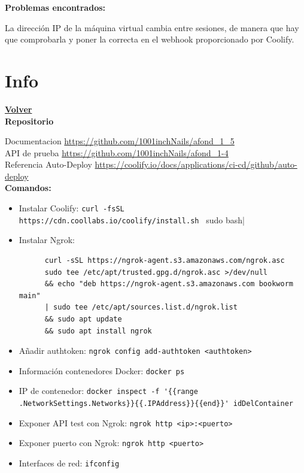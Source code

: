 \documentclass[a4paper,12pt]{article}
\begin{document}
\textbf{Problemas encontrados:}

La dirección IP de la máquina virtual cambia entre sesiones, de manera que hay que comprobarla y poner la correcta en el webhook proporcionado por Coolify.
\clearpage

\section{Info}
\hyperlink{anchor-indice}{\textbf{Volver}}\\

\textbf{Repositorio}

Documentacion
\url{https://github.com/1001inchNails/afond_1_5}\\

API de prueba
\url{https://github.com/1001inchNails/afond_1-4}\\

Referencia Auto-Deploy
\url{https://coolify.io/docs/applications/ci-cd/github/auto-deploy}\\

\textbf{Comandos:}
\begin{itemize}
    \item Instalar Coolify: \verb|curl -fsSL https://cdn.coollabs.io/coolify/install.sh | sudo bash|
    \item Instalar Ngrok: \begin{verbatim}
      curl -sSL https://ngrok-agent.s3.amazonaws.com/ngrok.asc
      sudo tee /etc/apt/trusted.gpg.d/ngrok.asc >/dev/null
      && echo "deb https://ngrok-agent.s3.amazonaws.com bookworm main"
      | sudo tee /etc/apt/sources.list.d/ngrok.list
      && sudo apt update
      && sudo apt install ngrok
      \end{verbatim}
    \item Añadir authtoken: \verb|ngrok config add-authtoken <authtoken>|
    \item Información contenedores Docker: \verb|docker ps|
    \item IP de contenedor: \verb|docker inspect -f '{{range .NetworkSettings.Networks}}{{.IPAddress}}{{end}}' idDelContainer|
    \item Exponer API test con Ngrok: \verb|ngrok http <ip>:<puerto>|
    \item Exponer puerto con Ngrok: \verb|ngrok http <puerto>|
    \item Interfaces de red: \verb|ifconfig|
    
\end{itemize}
\end{document}
